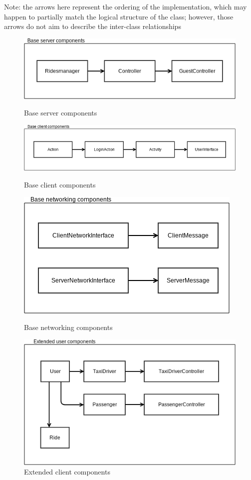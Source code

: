 Note: the arrows here represent the ordering of the implementation, which may happen to partially
match the logical structure of the class; however, those arrows do not aim to describe the inter-class
relationships

\begin{figure} [h]
  \centering
  \includegraphics[scale=0.72]{diagrams/point 1.png}
  \caption{\label{fig:base_serv_comp} Base server components}
  \vspace{3mm}
  \includegraphics[scale=0.6]{diagrams/point 2.png}
  \caption{\label{fig:base_client_comp} Base client components}
  \vspace{3mm}
  \includegraphics[scale=0.72]{diagrams/point 3.png}
  \caption{\label{fig:base_net_comp} Base networking components}
  \vspace{3mm}
  \includegraphics[scale=0.68]{diagrams/point 5.png}
  \caption{\label{fig:ext_client_comp} Extended client components}
\end{figure}

